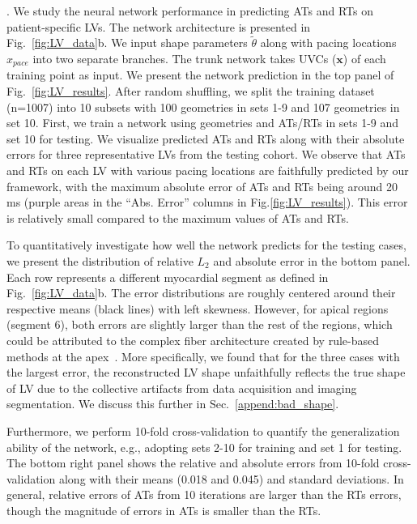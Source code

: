 \documentclass[review]{elsarticle}
\begin{document}
. We study the neural network performance in predicting ATs and RTs on patient-specific LVs. The network architecture is presented in Fig.~\ref{fig:LV_data}b. We input shape parameters $\tilde{\theta}$ along with pacing locations $\hat{x}_{pace}$ into two separate branches. The trunk network takes UVCs ($\mathbf{x}$) of each training point as input. We present the network prediction in the top panel of Fig.~\ref{fig:LV_results}. After random shuffling, we split the training dataset (n=1007) into 10 subsets with 100 geometries in sets 1-9 and 107 geometries in set 10. First, we train a network using geometries and ATs/RTs in sets 1-9 and set 10 for testing. We visualize predicted ATs and RTs along with their absolute errors for three representative LVs from the testing cohort. We observe that ATs and RTs on each LV with various pacing locations are faithfully predicted by our framework, with the maximum absolute error of ATs and RTs being around 20 ms (purple areas in the ``Abs. Error'' columns in Fig.\ref{fig:LV_results}). This error is relatively small compared to the maximum values of ATs and RTs. 

To quantitatively investigate how well the network predicts for the testing cases, we present the distribution of relative $L_{2}$ and absolute error in the bottom panel. Each row represents a different myocardial segment as defined in Fig.~\ref{fig:LV_data}b. The error distributions are roughly centered around their respective means (black lines) with left skewness. However, for apical regions (segment 6), both errors are slightly larger than the rest of the regions, which could be attributed to the complex fiber architecture created by rule-based methods at the apex~\cite{doste2019rule}. More specifically, we found that for the three cases with the largest error, the reconstructed LV shape unfaithfully reflects the true shape of LV due to the collective artifacts from data acquisition and imaging segmentation. We discuss this further in Sec.~\ref{append:bad_shape}.

Furthermore, we perform 10-fold cross-validation to quantify the generalization ability of the network, e.g., adopting sets 2-10 for training and set 1 for testing. The bottom right panel shows the relative and absolute errors from 10-fold cross-validation along with their means (0.018 and 0.045) and standard deviations. In general, relative errors of ATs from 10 iterations are larger than the RTs errors, though the magnitude of errors in ATs is smaller than the RTs. 
\end{document}
